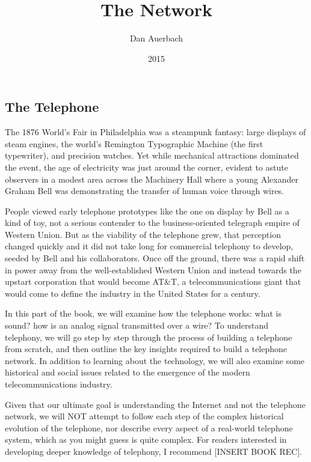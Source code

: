 \documentclass[UTF8]{book}
\begin{document}
\begin{CJK}{UTF8}{gbsn}

\title{The Network}
\author{Dan Auerbach}
\date{2015}
\maketitle

\part{The Telephone}

The 1876 World's Fair in Philadelphia was a steampunk fantasy: large displays of steam engines, the world's Remington Typographic Machine (the first typewriter), and precision watches. Yet while mechanical attractions dominated the event, the age of electricity was just around the corner, evident to astute observers in a modest area across the Machinery Hall where a young Alexander Graham Bell was demonstrating the transfer of human voice through wires.

People viewed early telephone prototypes like the one on display by Bell as a kind of toy, not a serious contender to the business-oriented telegraph empire of Western Union. But as the viability of the telephone grew, that perception changed quickly and it did not take long for commercial telephony to develop, seeded by Bell and his collaborators. Once off the ground, there was a rapid shift in power away from the well-established Western Union and instead towards the upstart corporation that would become AT\&T, a telecommunications giant that would come to define the industry in the United States for a century.

In this part of the book, we will examine how the telephone works: what is sound? how is an analog signal transmitted over a wire? To understand telephony, we will go step by step through the process of building a telephone from scratch, and then outline the key insights required to build a telephone network. In addition to learning about the technology, we will also examine some historical and social issues related to the emergence of the modern telecommunications industry.

Given that our ultimate goal is understanding the Internet and not the telephone network, we will NOT attempt to follow each step of the complex historical evolution of the telephone, nor describe every aspect of a real-world telephone system, which as you might guess is quite complex. For readers interested in developing deeper knowledge of telephony, I recommend [INSERT BOOK REC].


\end{CJK}
\end{document}
